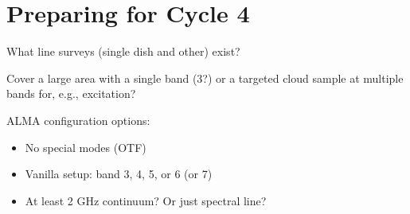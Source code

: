 \section{Preparing for Cycle 4}

What line surveys (single dish and other) exist?

Cover a large area with a single band (3?) or a targeted cloud sample at multiple bands for, e.g., excitation?


ALMA configuration options:

\begin{itemize}
    \item No special modes (OTF)
    \item Vanilla setup: band 3, 4, 5, or 6 (or 7)
    \item At least 2 GHz continuum?  Or just spectral line?
\end{itemize}